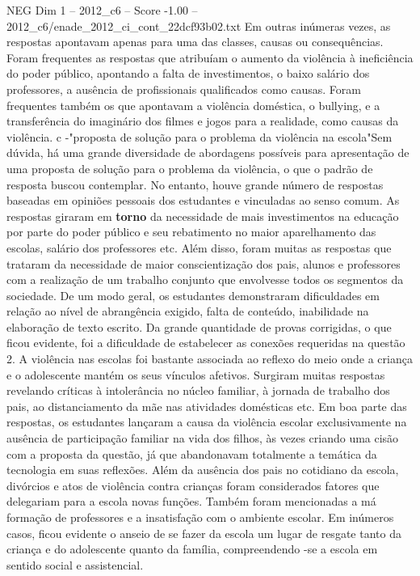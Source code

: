 \begin{textsample}{NEG Dim 1 – 2012\_c6 – Score -1.00 – 2012\_c6/enade\_2012\_ci\_cont\_22dcf93b02.txt}
Em outras inúmeras vezes, as respostas apontavam apenas para uma das classes, causas ou consequências.
Foram frequentes as respostas que atribuíam o aumento da violência à ineficiência do poder público, apontando a falta de investimentos, o baixo salário dos professores, a ausência de profissionais qualificados como causas.
Foram frequentes também os que apontavam a violência doméstica, o bullying, e a transferência do imaginário dos filmes e jogos para a realidade, como causas da violência. c -"proposta de solução para o problema da violência na escola"Sem dúvida, há uma grande diversidade de abordagens possíveis para apresentação de uma proposta de solução para o problema da violência, o que o padrão de resposta buscou contemplar.
No entanto, houve grande número de respostas baseadas em opiniões pessoais dos estudantes e vinculadas ao senso comum.
As respostas giraram em \textbf{torno} da necessidade de mais investimentos na educação por parte do poder público e seu rebatimento no maior aparelhamento das escolas, salário dos professores etc.
Além disso, foram muitas as respostas que trataram da necessidade de maior conscientização dos pais, alunos e professores com a realização de um trabalho conjunto que envolvesse todos os segmentos da sociedade.
De um modo geral, os estudantes demonstraram dificuldades em relação ao nível de abrangência exigido, falta de conteúdo, inabilidade na elaboração de texto escrito.
Da grande quantidade de provas corrigidas, o que ficou evidente, foi a dificuldade de estabelecer as conexões requeridas na questão 2.
A violência nas escolas foi bastante associada ao reflexo do meio onde a criança e o adolescente mantém os seus vínculos afetivos.
Surgiram muitas respostas revelando críticas à intolerância no núcleo familiar, à jornada de trabalho dos pais, ao distanciamento da mãe nas atividades domésticas etc.
Em boa parte das respostas, os estudantes lançaram a causa da violência escolar exclusivamente na ausência de participação familiar na vida dos filhos, às vezes criando uma cisão com a proposta da questão, já que abandonavam totalmente a temática da tecnologia em suas reflexões.
Além da ausência dos pais no cotidiano da escola, divórcios e atos de violência contra crianças foram considerados fatores que delegariam para a escola novas funções.
Também foram mencionadas a má formação de professores e a insatisfação com o ambiente escolar.
Em inúmeros casos, ficou evidente o anseio de se fazer da escola um lugar de resgate tanto da criança e do adolescente quanto da família, compreendendo -se a escola em sentido social e assistencial.

\end{textsample}
